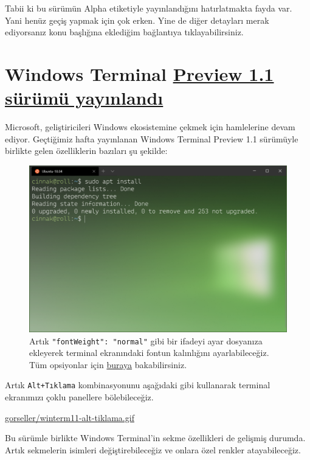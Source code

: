 \documentclass[11pt]{article}
\begin{document}
Tabii ki bu sürümün Alpha etiketiyle yayınlandığını hatırlatmakta fayda var.
Yani henüz geçiş yapmak için çok erken. Yine de diğer detayları merak
ediyorsanız konu başlığına eklediğim bağlantıya tıklayabilirsiniz.
\section{Windows Terminal \href{https://devblogs.microsoft.com/commandline/windows-terminal-preview-1-1-release/}{Preview 1.1 sürümü yayınlandı}}
\label{sec:org2565e69}
Microsoft, geliştiricileri Windows ekosistemine çekmek için hamlelerine devam
ediyor. Geçtiğimiz hafta yayınlanan Windows Terminal Preview 1.1 sürümüyle
birlikte gelen özelliklerin bazıları şu şekilde:

\begin{figure}[htbp]
\centering
\includegraphics[width=.9\linewidth]{gorseller/winterm11-font-weight.png}
\caption[\texttt{"fontWeight": "normal"}]{Artık \texttt{"fontWeight": "normal"} gibi bir ifadeyi ayar dosyanıza ekleyerek terminal ekranındaki fontun kalınlığını ayarlabileceğiz. Tüm opsiyonlar için \href{https://docs.microsoft.com/en-us/windows/terminal/customize-settings/profile-settings\#text-settings}{buraya} bakabilirsiniz.}
\end{figure}
\newpage

Artık \texttt{Alt+Tıklama} kombinasyonunu aşağıdaki gibi kullanarak terminal
ekranımızı çoklu panellere bölebileceğiz.

\url{gorseller/winterm11-alt-tiklama.gif}

Bu sürümle birlikte Windows Terminal'in sekme özellikleri de gelişmiş durumda.
Artık sekmelerin isimleri değiştirebileceğiz ve onlara özel renkler
atayabileceğiz.
\end{document}
